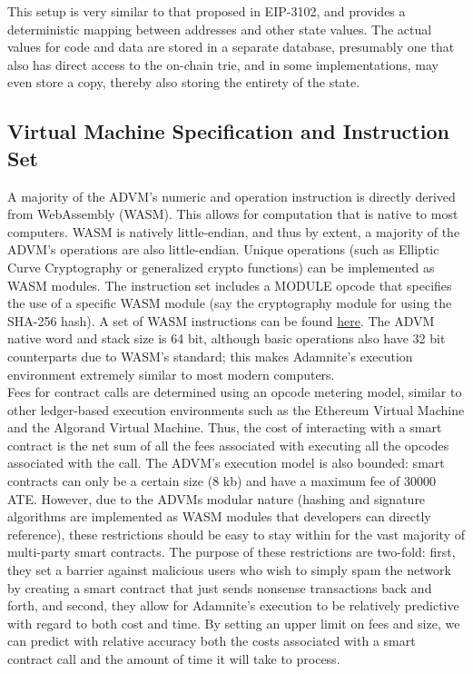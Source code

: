 \documentclass[conference]{IEEEtran}
\begin{document}
This setup is very similar to that proposed in EIP-3102, and provides a deterministic mapping between addresses and other state values. The actual values for code and data are stored in a separate database, presumably one that also has direct access to the on-chain trie, and in some implementations, may even store a copy, thereby also storing the entirety of the state.
\subsection{Virtual Machine Specification and Instruction Set}

A majority of the ADVM's numeric and operation instruction is directly derived from WebAssembly (WASM). This allows for computation that is native to most computers. WASM is natively little-endian, and thus by extent, a majority of the ADVM's operations are also little-endian. Unique operations (such as Elliptic Curve Cryptography or generalized crypto functions) can be implemented as WASM modules. The instruction set includes a MODULE opcode that specifies the use of a specific WASM module (say the cryptography module for using the SHA-256 hash). A set of WASM instructions can be found \href{https://webassembly.github.io/spec/core/binary/instructions.html}{here}. The ADVM native word and stack size is 64 bit, although basic operations also have 32 bit counterparts due to WASM's standard; this makes Adamnite's execution environment extremely similar to most modern computers. \\

Fees for contract calls are determined using an opcode metering model, similar to other ledger-based execution environments such as the Ethereum Virtual Machine and the Algorand Virtual Machine. Thus, the cost of interacting with a smart contract is the net sum of all the fees associated with executing all the opcodes associated with the call. The ADVM's execution model is also bounded: smart contracts can only be a certain size (8 kb) and have a maximum fee of 30000 ATE. However, due to the ADVMs modular nature (hashing and signature algorithms are implemented as WASM modules that developers can directly reference), these restrictions should be easy to stay within for the vast majority of multi-party smart contracts. The purpose of these restrictions are two-fold: first, they set a barrier against malicious users who wish to simply spam the network by creating a smart contract that just sends nonsense transactions back and forth, and second, they allow for Adamnite's execution to be relatively predictive with regard to both cost and time. By setting an upper limit on fees and size, we can predict with relative accuracy both the costs associated with a smart contract call and the amount of time it will take to process.
\end{document}
